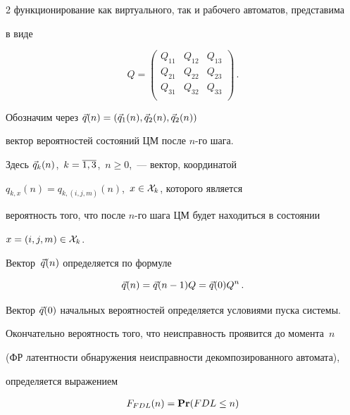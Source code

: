 \begin{multicols}{2}
функционирование как виртуального, так и рабочего автоматов, представима


в виде


$$


Q


=


\begin{pmatrix}


 Q_{11} & Q_{12} & Q_{13} \\


 Q_{21} & Q_{22} & Q_{23} \\


 Q_{31} & Q_{32} & Q_{33} \\


\end{pmatrix}\,.


$$





 Обозначим через $\vec q(n)=(\vec q_1(n),\vec q_2(n),\vec q_2(n))$


вектор вероятностей состояний ЦМ после $n$-го шага.


Здесь $\vec q_k(n)$,\ $k=\overline{1,3}$,\ $n\ge 0$,~--- вектор, координатой


$q_{k,x}(n)=q_{k,(i,j,m)}(n)$,\ $x\in {\cal X}_k$, которого является


вероятность того, что после $n$-го шага ЦМ будет находиться в состоянии


$x=(i,j,m)\in {\cal X}_k$.


Вектор~$\vec q(n)$ определяется по формуле


$$


\v q(n) = \v q(n-1) Q = \v q(0) Q^n\,.


$$


Вектор $\vec q(0)$ начальных вероятностей определяется условиями пуска системы.








 Окончательно вероятность того, что неисправность проявится до момента~$n$


 (ФР латентности обнаружения неисправности декомпозированного автомата),


определяется выражением


\begin{multline*}


F_{FDL}(n)


=


{\bf Pr}(FDL\le n)



\end{multline*}
\end{multicols}
